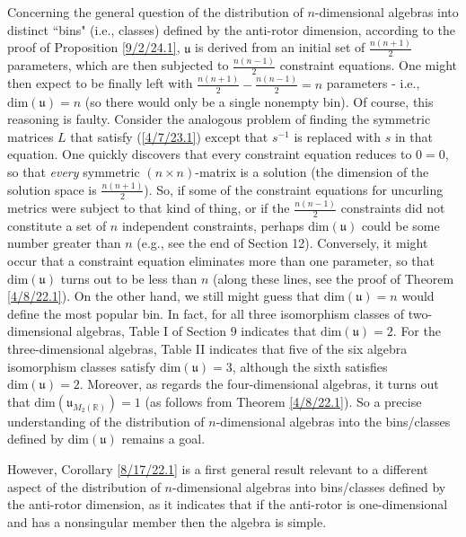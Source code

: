 \documentclass{amsart}
\numberwithin{equation}{section}
\theoremstyle{definition}
\numberwithin{theorem}{section}
\begin{document}
Concerning the general question of the distribution of $n$-dimensional algebras into distinct ``bins" (i.e., classes) defined by the anti-rotor dimension, according to the proof of Proposition \ref{9/2/24.1}, $\mathfrak{u}$ is derived from an initial set of $\frac{n(n+1)}{2}$ parameters, which are then subjected to  $\frac{n(n-1)}{2}$ constraint equations.  One might then expect to be finally left with $\frac{n(n+1)}{2} - \frac{n(n-1)}{2} = n$ parameters - i.e., $\text{dim}(\mathfrak{u}) = n$ (so there would only be a single nonempty bin).  Of course, this reasoning is faulty.  Consider the analogous problem of finding the symmetric matrices $L$ that satisfy (\ref{4/7/23.1}) except that $s^{-1}$ is replaced with $s$ in that equation.  One quickly discovers that every constraint equation reduces to $0=0$, so that {\it every} symmetric $(n\times n)$-matrix is a solution (the dimension of the solution space is $\frac{n(n+1)}{2}$).  So, if some of the constraint equations for uncurling metrics were subject to  that kind of thing, or if the $\frac{n(n-1)}{2}$ constraints did not constitute a set of $n$ independent constraints, perhaps $\text{dim}(\mathfrak{u})$ could be some number greater than $n$ (e.g., see the end of Section 12).  Conversely, it might occur that a constraint equation eliminates more than one parameter, so that $\text{dim}(\mathfrak{u})$ turns out to be less than $n$ (along these lines, see the proof of Theorem \ref{4/8/22.1}).  On the other hand, we still might guess that $\text{dim}(\mathfrak{u}) = n$ would define the most popular bin.  In fact, for all three isomorphism classes of two-dimensional algebras, Table I of Section 9 indicates that \mbox{$\text{dim}(\mathfrak{u}) = 2$}.  For the three-dimensional algebras, Table II indicates that five of the six algebra isomorphism classes satisfy $\text{dim}(\mathfrak{u}) = 3$, although the sixth satisfies $\text{dim}(\mathfrak{u}) = 2$.  Moreover, as regards the four-dimensional algebras, it turns out that $\text{dim}(\mathfrak{u}_{M_2(\mathbb{R})}) = 1$ (as follows from Theorem \ref{4/8/22.1}). So a precise understanding of the distribution of $n$-dimensional algebras into the bins/classes defined by $\text{dim}(\mathfrak{u})$ remains a goal.  

However, Corollary \ref{8/17/22.1} is a first general result relevant to a different aspect of the distribution of $n$-dimensional algebras into bins/classes defined by the anti-rotor dimension, as it indicates that if the anti-rotor is one-dimensional and has a nonsingular member then the algebra is simple.  
\end{document}
